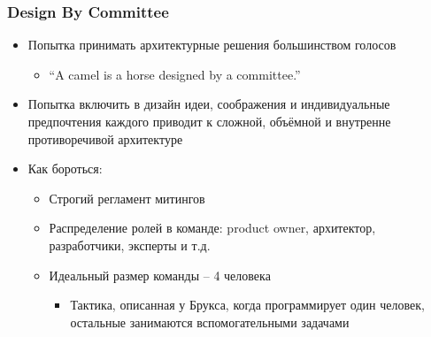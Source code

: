 \documentclass[xetex,mathserif,serif]{beamer}
\begin{document}
    \begin{frame}
        \frametitle{Design By Committee}
        \begin{itemize}
            \item Попытка принимать архитектурные решения большинством голосов
            \begin{itemize}
                \item ``A camel is a horse designed by a committee.''
            \end{itemize}
            \item Попытка включить в дизайн идеи, соображения и индивидуальные предпочтения каждого приводит к сложной, объёмной и внутренне противоречивой архитектуре
            \item Как бороться:
            \begin{itemize}
                \item Строгий регламент митингов
                \item Распределение ролей в команде: product owner, архитектор, разработчики, эксперты и т.д.
                \item Идеальный размер команды – 4 человека
                \begin{itemize}
                    \item Тактика, описанная у Брукса, когда программирует один человек, остальные занимаются вспомогательными задачами
                \end{itemize}
            \end{itemize}
        \end{itemize}
    \end{frame}
\end{document}
